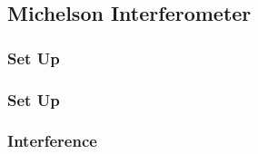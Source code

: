 \documentclass{beamer}
\newcommand{\gra}[3][]{
	\begin{table}
	\centering
	\begin{tabular}[width=\textwidth]{c}
		\texttt{[image: ../figures/\#2.png]}\\
		\small #3
	\end{tabular}
	\end{table}
}
\begin{document}
\subsection{Michelson Interferometer}
\frame{\tableofcontents[currentsubsection]}
\begin{frame}
	\frametitle{Set Up}
\end{frame}
\begin{frame}
	\frametitle{Set Up}
	\begin{figure}
		\centering
	\end{figure}
\end{frame}
\begin{frame}
	\frametitle{Interference}
\end{frame}
\end{document}
